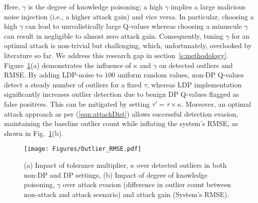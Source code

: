 Here, $\gamma$ is the degree of knowledge poisoning; a high $\gamma$ implies a large malicious noise injection (i.e., a higher attack gain) and vice versa. In particular, choosing a high $\gamma$ can lead to unrealistically large Q-values whereas choosing a minuscule $\gamma$ can result in negligible to almost zero attack gain. Consequently, tuning $\gamma$ for an optimal attack is non-trivial but challenging, which, unfortunately, overlooked by literature so far. We address this research gap in section~\ref{s:methodology}. Figure~\ref{fig:outlier_rmse}(a) demonstrates the influence of $\kappa$ and $\gamma$ on detected outliers and RMSE. By adding LDP-noise to $100$ uniform random values, non-DP Q-values detect a steady number of outliers for a fixed $\tau$, whereas LDP implementation significantly increases outlier detection due to benign DP Q-values flagged as false positives. This can be mitigated by setting $\tau' = \tau\times\kappa$. Moreover, an optimal attack approach as per (\ref{eqn:attackDist}) allows successful detection evasion, maintaining the baseline outlier count while inflating the system's RMSE, as shown in Fig.~\ref{fig:outlier_rmse}(b).
\begin{figure}[!ht]
\centerline{\texttt{[image: Figures/Outlier\_RMSE.pdf]}}
\caption{\small (a) Impact of tolerance multiplier, $\kappa$ over detected outliers in both non-DP and DP settings, (b) Impact of degree of knowledge poisoning, $\gamma$ over attack evasion (difference in outlier count between non-attack and attack scenario) and attack gain (System's RMSE).}
\label{fig:outlier_rmse}
\end{figure}

